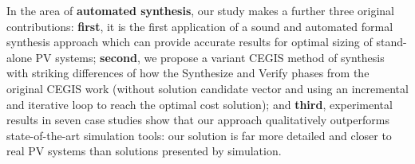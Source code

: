 In the area of \textbf{automated synthesis}, our study makes a further three original contributions: \textbf{first}, it is the first application of a sound and automated formal synthesis approach which can provide accurate results for optimal sizing of stand-alone PV systems; \textbf{second}, we propose a variant CEGIS method of synthesis with striking differences of how the Synthesize and Verify phases from the original CEGIS work (without solution candidate vector and using an incremental and iterative loop to reach the optimal cost solution); and \textbf{third}, experimental results in seven case studies show that our approach qualitatively outperforms state-of-the-art simulation tools: our solution is far more detailed and closer to real PV systems than solutions presented by simulation.
%
%
%
